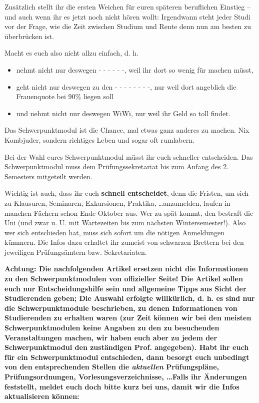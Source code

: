 Zusätzlich stellt ihr die ersten Weichen für euren späteren
  beruf\/lichen Einstieg -- und auch wenn ihr es jetzt noch nicht hören
  wollt: Irgendwann steht jeder Studi vor der Frage, wie die Zeit
  zwischen Studium und Rente denn nun am besten zu überbrücken ist.

Macht es euch also nicht allzu einfach, d. h.

\begin{itemize}

\item nehmt nicht nur deswegen - - - - - -, weil ihr dort so wenig für machen müsst,

\item geht nicht nur deswegen zu den - - - - - - - -, nur weil dort
   angeblich die Frauenquote bei 90\% liegen soll

\item und nehmt nicht nur deswegen WiWi, nur weil ihr Geld so toll findet.

\end{itemize}

Das Schwerpunktmodul ist die Chance, mal etwas ganz anderes zu machen.  Nix
  Kombjuder, sondern richtiges Leben und sogar oft rumlabern.

Bei der Wahl eures Schwerpunktmodul müsst ihr euch schneller entscheiden. Das Schwerpunktmodul muss dem Prüfungssekretariat bis zum Anfang des 2. Semesters mitgeteilt werden. 

Wichtig ist auch, dass ihr euch \textbf{schnell entscheidet}, denn die
  Fristen, um sich zu Klausuren, Seminaren, Exkursionen, Praktika,
  \dots anzumelden, laufen in manchen Fächern schon Ende Oktober aus.
  Wer zu spät kommt, den bestraft die Uni (und zwar u. U. mit
  Wartezeiten bis zum nächsten Wintersemester!).  Also wer sich
  entschieden hat, muss sich sofort um die nötigen Anmeldungen
  kümmern.  Die Infos dazu erhaltet ihr zumeist von schwarzen Brettern
  bei den jeweiligen Prüfungsämtern bzw. Sekretariaten.

\textbf{Achtung: Die nachfolgenden Artikel ersetzen nicht die
  Informationen zu den Schwerpunktmodulen von offizieller Seite!  Die Artikel
  sollen euch nur Entscheidungshilfe sein und allgemeine Tipps aus Sicht
  der Studierenden geben;  Die Auswahl erfolgte willkürlich, d. h. es sind
  nur die Schwerpunktmodule beschrieben, zu denen Informationen von
  Studierenden zu erhalten waren (zur Zeit können wir bei den meisten Schwerpunktmodulen keine Angaben zu den zu besuchenden Veranstaltungen machen, wir haben euch aber zu jedem der Schwerpunktmodul den zuständigen Prof. angegeben). Habt ihr euch für ein Schwerpunktmodul
  entschieden, dann besorgt euch unbedingt von den entsprechenden
  Stellen die \emph{aktuellen} Prüfungspläne, Prüfungsordnungen,
  Vorlesungsverzeichnisse, \dots Falls ihr Änderungen
  feststellt, meldet euch doch bitte kurz bei uns, damit wir die Infos
  aktualisieren können: }

